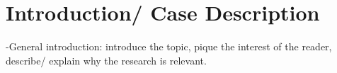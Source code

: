 \chapter{Introduction/ Case Description}
-General introduction: introduce the topic, pique the interest of the reader, describe/ explain why the research is relevant.
